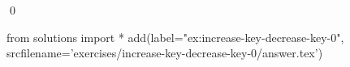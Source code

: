 
\begin{ex} 
  \label{ex:increase-key-decrease-key-0}
  
  \qed
\end{ex} 
\begin{python0}
from solutions import *
add(label="ex:increase-key-decrease-key-0",
    srcfilename='exercises/increase-key-decrease-key-0/answer.tex') 
\end{python0}
